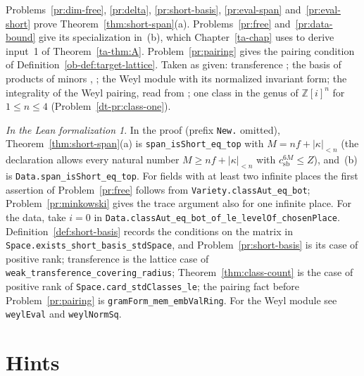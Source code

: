 \documentclass[reqno]{amsart}
\newcounter{chap}
\theoremstyle{definition}
\theoremstyle{plain}
\theoremstyle{remark}
\newtheorem*{leanremark}{In the Lean formalization}
\newcommand{\Z}{\mathbb{Z}}
\newcommand{\csb}{c_{\mathrm{sb}}}
\newcommand{\tl}[1]{\texttt{#1}}
\begin{document}
Problems~\ref{pr:dim-free}, \ref{pr:delta}, \ref{pr:short-basis}, \ref{pr:eval-span} and~\ref{pr:eval-short} prove Theorem~\ref{thm:short-span}(a).  Problems~\ref{pr:free} and~\ref{pr:data-bound} give its specialization in~(b), which Chapter~\ref{ta-chap} uses to derive input~1 of Theorem~\ref{ta-thm:A}.  Problem~\ref{pr:pairing} gives the pairing condition of Definition~\ref{ob-def:target-lattice}.  Taken as given: transference \cite{Ba}; the basis of products of minors \cite{DEP}, \cite{Fu}; the Weyl module with its normalized invariant form; the integrality of the Weyl pairing, read from \cite{GL}; one class in the genus of \(\Z[i]^n\) for \(1\le n\le4\) (Problem~\ref{dt-pr:class-one}).

\begin{leanremark}
In the proof \cite{GL} (prefix \tl{New.} omitted), Theorem~\ref{thm:short-span}(a) is \tl{span\_isShort\_eq\_top} with \(M=nf+\lvert\kappa\rvert_{<n}\) (the declaration allows every natural number \(M\ge nf+\lvert\kappa\rvert_{<n}\) with \(\csb^{6M}\le Z\)), and~(b) is \tl{Data.span\_isShort\_eq\_top}.  For fields with at least two infinite places the first assertion of Problem~\ref{pr:free} follows from \tl{Variety.classAut\_eq\_bot}; Problem~\ref{pr:minkowski} gives the trace argument also for one infinite place.  For the data, take \(i=0\) in \tl{Data.classAut\_eq\_bot\_of\_le\_levelOf\_chosenPlace}.  Definition~\ref{def:short-basis} records the conditions on the matrix in \tl{Space.exists\_short\_basis\_stdSpace}, and Problem~\ref{pr:short-basis} is its case of positive rank; transference is the lattice case of \tl{weak\_transference\_covering\_radius}; Theorem~\ref{thm:class-count} is the case of positive rank of \tl{Space.card\_stdClasses\_le}; the pairing fact before Problem~\ref{pr:pairing} is \tl{gramForm\_mem\_embValRing}.  For the Weyl module see \tl{weylEval} and \tl{weylNormSq}.
\end{leanremark}

\section*{Hints}
\end{document}
